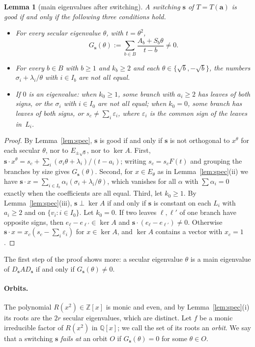 \documentclass[11pt]{article}
\numberwithin{equation}{section}
\newtheorem{lemma}{Lemma}[section]
\theoremstyle{remark}
\newcommand{\Q}{\mathbb Q}
\newcommand{\Z}{\mathbb Z}
\newcommand{\s}{\mathbf s}
\newcommand{\bfa}{\mathbf a}
\begin{document}
\begin{lemma}[main eigenvalues after switching]\label{lem:main}
A switching $\s$ of $T=T(\bfa)$ is good if and only if the following three
conditions hold.
\begin{itemize}
\item[(S)] For every secular eigenvalue $\theta$, with $t=\theta^2$,
 \[
 G_{\s}(\theta):=\sum_{b\in B}\frac{A_b+S_b\theta}{t-b}\ne0 .
 \]
\item[(L)] For every $b\in B$ with $b\ge1$ and $k_b\ge2$ and each
 $\theta\in\{\sqrt b,-\sqrt b\}$, the numbers $\sigma_i+\lambda_i/\theta$
 with $i\in I_b$ are not all equal.
\item[(Z)] If $0$ is an eigenvalue: when $k_0\ge1$, some branch with
 $a_i\ge2$ has leaves of both signs, or the $\sigma_i$ with $i\in I_0$ are not
 all equal; when $k_0=0$, some branch has leaves of both signs, or
 $s_c\ne\sum_i\varepsilon_i$, where $\varepsilon_i$ is the common sign of the
 leaves in~$L_i$.
\end{itemize}
\end{lemma}
\begin{proof}
By Lemma~\ref{lem:spec}, $\s$ is good if and only if $\s$ is not orthogonal to
$x^\theta$ for each secular $\theta$, nor to $E_{\pm\sqrt b}$, nor to
$\ker A$. First,
$\s\cdot x^\theta=s_c+\sum_i(\sigma_i\theta+\lambda_i)/(t-a_i)$; writing
$s_c=s_cF(t)$ and grouping the branches by size gives $G_{\s}(\theta)$.
Second, for $x\in E_\theta$ as in Lemma~\ref{lem:spec}(ii) we have
$\s\cdot x=\sum_{i\in I_b}\alpha_i(\sigma_i+\lambda_i/\theta)$, which vanishes
for all $\alpha$ with $\sum\alpha_i=0$ exactly when the coefficients are all
equal. Third, let $k_0\ge1$. By Lemma~\ref{lem:spec}(iii), $\s\perp\ker A$ if
and only if $\s$ is constant on each $L_i$ with $a_i\ge2$ and on
$\{v_i:i\in I_0\}$. Let $k_0=0$. If two leaves $\ell,\ell'$ of one branch have
opposite signs, then $e_\ell-e_{\ell'}\in\ker A$ and
$\s\cdot(e_\ell-e_{\ell'})\ne0$. Otherwise $\s\cdot x=x_c(s_c-\sum_i\varepsilon_i)$
for $x\in\ker A$, and $\ker A$ contains a vector with $x_c=1$.
\end{proof}

The first step of the proof shows more: a secular eigenvalue $\theta$ is a
main eigenvalue of $D_{\s}AD_{\s}$ if and only if $G_{\s}(\theta)\ne0$.

\paragraph{Orbits.}
The polynomial $R(x^2)\in\Z[x]$ is monic and even, and by
Lemma~\ref{lem:spec}(i) its roots are the $2r$ secular eigenvalues, which are
distinct. Let $f$ be a monic irreducible factor of $R(x^2)$ in $\Q[x]$; we call
the set of its roots an \emph{orbit}. We say that a switching $\s$ \emph{fails at} an orbit
$O$ if $G_{\s}(\theta)=0$ for some $\theta\in O$.
\end{document}
